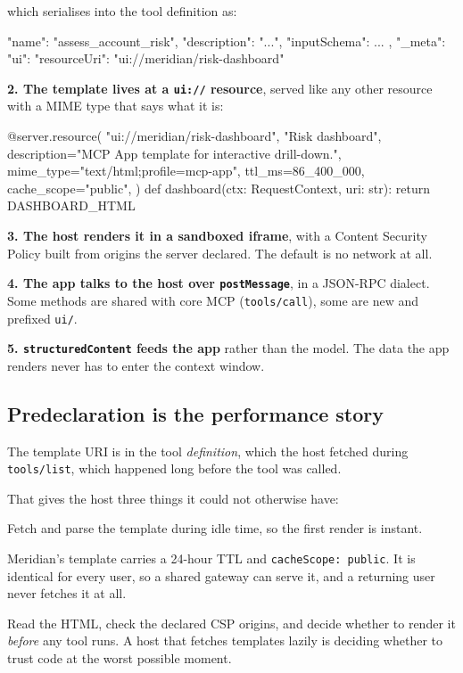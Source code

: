 which serialises into the tool definition as:

\begin{wire}
{
  "name": "assess_account_risk",
  "description": "...",
  "inputSchema": { ... },
  "_meta": { "ui": { "resourceUri": "ui://meridian/risk-dashboard" } }
}
\end{wire}

\textbf{2. The template lives at a \texttt{ui://} resource}, served like any
other resource with a MIME type that says what it is:

\begin{py}
@server.resource(
    "ui://meridian/risk-dashboard",
    "Risk dashboard",
    description="MCP App template for interactive drill-down.",
    mime_type="text/html;profile=mcp-app",
    ttl_ms=86_400_000,
    cache_scope="public",
)
def dashboard(ctx: RequestContext, uri: str):
    return DASHBOARD_HTML
\end{py}

\textbf{3. The host renders it in a sandboxed iframe}, with a Content Security
Policy built from origins the server declared. The default is no network at all.

\textbf{4. The app talks to the host over \texttt{postMessage}}, in a JSON-RPC
dialect. Some methods are shared with core MCP (\texttt{tools/call}), some are
new and prefixed \texttt{ui/}.

\textbf{5. \texttt{structuredContent} feeds the app} rather than the model. The
data the app renders never has to enter the context window.

\subsection{Predeclaration is the performance story}

The template URI is in the tool \emph{definition}, which the host fetched during
\texttt{tools/list}, which happened long before the tool was called.

That gives the host three things it could not otherwise have:

\begin{description}[leftmargin=1.4em, style=nextline, itemsep=3pt]
\item[Prefetch] Fetch and parse the template during idle time, so the first render is instant.
\item[Cache] Meridian's template carries a 24-hour TTL and
\texttt{cacheScope: public}. It is identical for every user, so a shared gateway
can serve it, and a returning user never fetches it at all.
\item[Security review] Read the HTML, check the declared CSP origins, and decide
whether to render it \emph{before} any tool runs. A host that fetches templates
lazily is deciding whether to trust code at the worst possible moment.
\end{description}


